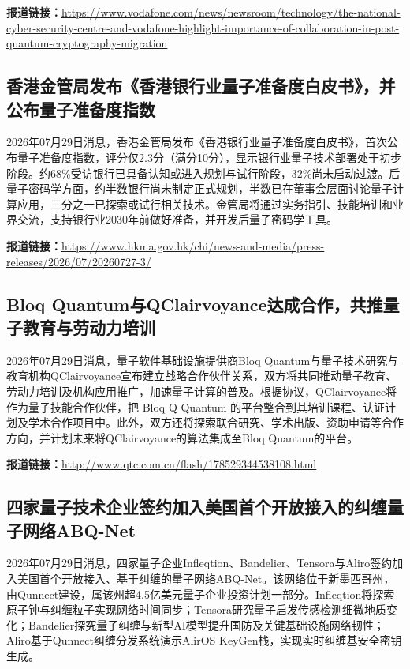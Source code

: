 \documentclass[12pt,a4paper]{ctexart}
\begin{document}
\noindent\textbf{报道链接：}\url{https://www.vodafone.com/news/newsroom/technology/the-national-cyber-security-centre-and-vodafone-highlight-importance-of-collaboration-in-post-quantum-cryptography-migration}

\subsection{ 香港金管局发布《香港银行业量子准备度白皮书》，并公布量子准备度指数 }

2026年07月29日消息，香港金管局发布《香港银行业量子准备度白皮书》，首次公布量子准备度指数，评分仅2.3分（满分10分），显示银行业量子技术部署处于初步阶段。约68\%受访银行已具备认知或进入规划与试行阶段，32\%尚未启动过渡。后量子密码学方面，约半数银行尚未制定正式规划，半数已在董事会层面讨论量子计算应用，三分之一已探索或试行相关技术。金管局将通过实务指引、技能培训和业界交流，支持银行业2030年前做好准备，并开发后量子密码学工具。

\noindent\textbf{报道链接：}\url{https://www.hkma.gov.hk/chi/news-and-media/press-releases/2026/07/20260727-3/}

\subsection{ Bloq Quantum与QClairvoyance达成合作，共推量子教育与劳动力培训 }

2026年07月29日消息，量子软件基础设施提供商Bloq Quantum与量子技术研究与教育机构QClairvoyance宣布建立战略合作伙伴关系，双方将共同推动量子教育、劳动力培训及机构应用推广，加速量子计算的普及。根据协议，QClairvoyance将作为量子技能合作伙伴，把 Bloq Q Quantum 的平台整合到其培训课程、认证计划及学术合作项目中。此外，双方还将探索联合研究、学术出版、资助申请等合作方向，并计划未来将QClairvoyance的算法集成至Bloq Quantum的平台。

\noindent\textbf{报道链接：}\url{http://www.qtc.com.cn/flash/178529344538108.html}

\subsection{ 四家量子技术企业签约加入美国首个开放接入的纠缠量子网络ABQ-Net }

2026年07月29日消息，四家量子企业Infleqtion、Bandelier、Tensora与Aliro签约加入美国首个开放接入、基于纠缠的量子网络ABQ-Net。该网络位于新墨西哥州，由Qunnect建设，属该州超4.5亿美元量子企业投资计划一部分。Infleqtion将探索原子钟与纠缠粒子实现网络时间同步；Tensora研究量子启发传感检测细微地质变化；Bandelier探究量子纠缠与新型AI模型提升国防及关键基础设施网络韧性；Aliro基于Qunnect纠缠分发系统演示AlirOS KeyGen栈，实现实时纠缠基安全密钥生成。
\end{document}
